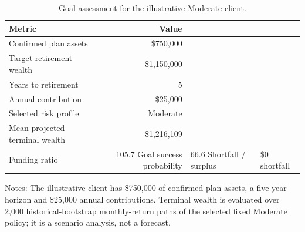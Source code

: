 \begin{table}[htbp]
\centering
\footnotesize
\caption{Goal assessment for the illustrative Moderate client.}
\label{tab:gbi-demo-goal-assessment}
\begin{tabular}{lr}
\toprule
Metric & Value \\
\midrule
Confirmed plan assets & \$750,000 \\
Target retirement wealth & \$1,150,000 \\
Years to retirement & 5 \\
Annual contribution & \$25,000 \\
Selected risk profile & Moderate \\
Mean projected terminal wealth & \$1,216,109 \\
Funding ratio & 105.7%
Goal success probability & 66.6%
Shortfall / surplus & \$0 shortfall \\
\bottomrule
\end{tabular}
\vspace{2pt}
\begin{minipage}{0.92\linewidth}
\footnotesize
Notes: The illustrative client has \$750,000 of confirmed plan assets, a five-year horizon and \$25,000 annual contributions. Terminal wealth is evaluated over 2,000 historical-bootstrap monthly-return paths of the selected fixed Moderate policy; it is a scenario analysis, not a forecast.
\end{minipage}
\end{table}
